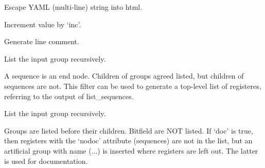 \documentclass[letterpaper,10pt,english]{sphinxmanual}
\begin{document}

\begin{fulllineitems}
\label{\detokenize{developer:wuppercodegen.filter.html_string}}
Escape YAML (multi-line) string into html.

\end{fulllineitems}


\begin{fulllineitems}
\label{\detokenize{developer:wuppercodegen.filter.inc}}
Increment value by `inc'.

\end{fulllineitems}


\begin{fulllineitems}
\label{\detokenize{developer:wuppercodegen.filter.line_comment}}
Generate line comment.

\end{fulllineitems}


\begin{fulllineitems}
\label{\detokenize{developer:wuppercodegen.filter.list_nodes_and_sequences}}
List the input group recursively.

A sequence is an end node. Children of groups agreed
listed, but children of sequences are not. This filter can be used to generate a top-level
list of registeres, referring to the output of list\_sequences.

\end{fulllineitems}


\begin{fulllineitems}
\label{\detokenize{developer:wuppercodegen.filter.list_nodes_recursively}}
List the input group recursively.

Groups are listed before their children. Bitfield are NOT listed.
If `doc' is true, then registers with the `nodoc' attribute (sequences) are not in the list, but
an artificial group with name (...) is inserted where registers are left out. The latter is used
for documentation.

\end{fulllineitems}
\end{document}
